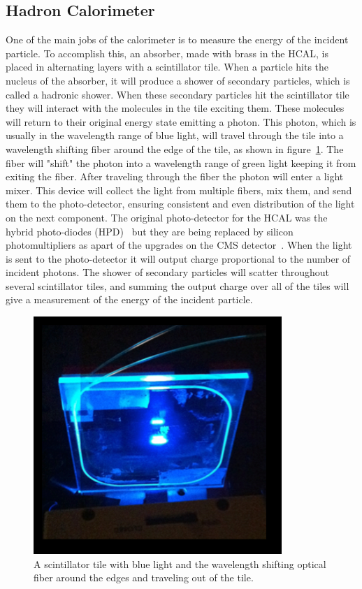 \subsection{Hadron Calorimeter} \label{HCAL}
One of the main jobs of the calorimeter is to measure the energy of the incident particle. To accomplish this, an absorber, made with brass in the HCAL, is placed in alternating layers with a scintillator tile. When a particle hits the nucleus of the absorber, it will produce a shower of secondary particles, which is called a hadronic shower. When these secondary particles hit the scintillator tile they will interact with the molecules in the tile exciting them. These molecules will return to their original energy state emitting a photon. This photon, which is usually in the wavelength range of blue light, will travel through the tile into a wavelength shifting fiber around the edge of the tile, as shown in figure~\ref{fig:Tile}. The fiber will "shift" the photon into a wavelength range of green light keeping it from exiting the fiber. After traveling through the fiber the photon will enter a light mixer. This device will collect the light from multiple fibers, mix them, and send them to the photo-detector, ensuring consistent and even distribution of the light on the next component. The original photo-detector for the HCAL was the hybrid photo-diodes (HPD)~\cite{HPD} but they are being replaced by silicon photomultipliers as apart of the upgrades on the CMS detector~\cite{HCALPhase1}. When the light is sent to the photo-detector it will output charge proportional to the number of incident photons. The shower of secondary particles will scatter throughout several scintillator tiles, and summing the output charge over all of the tiles will give a measurement of the energy of the incident particle. 
\begin{figure}
\centering
\includegraphics[width=0.6\linewidth]{Figures/Tile.png}
\caption{A scintillator tile with blue light and the wavelength shifting optical fiber around the edges and traveling out of the tile.}
\label{fig:Tile}
\end{figure}


